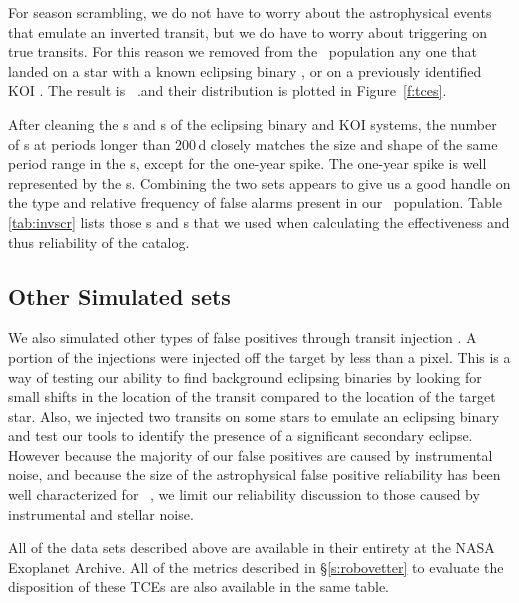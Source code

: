 For season scrambling, we do not have to worry about the astrophysical events that emulate an inverted transit, but we do have to worry about triggering on true transits. For this reason we removed from the \scrtce\ population any one that landed on a star with a known eclipsing binary \citep{Kirk2016}, or on a previously identified KOI \citep{Coughlin2016}.  The result is \nscrtces\ \scrtce.and their distribution is plotted in Figure~\ref{f:tces}. 

After cleaning the \invtce s and \scrtce s of the eclipsing binary and KOI systems, the number of \scrtce s at periods longer than 200\,d closely matches the size and shape of the same period range in the \opstce s, except for the one-year spike.  The one-year spike is well represented by the \invtce s.  Combining the two sets appears to give us a good handle on the type and relative frequency of false alarms present in our \opstce\ population. Table\,\ref{tab:invscr} lists those \invtce s and \sctce s that we used when calculating the effectiveness and thus reliability of the catalog.



\subsection{Other Simulated sets}
We also simulated other types of false positives through transit injection \citep{Christiansen2017}. A portion of the injections were injected off the target by less than a pixel.  This is a way of testing our ability to find background eclipsing binaries by looking for small shifts in the location of the transit compared to the location of the target star.  Also, we injected two transits on some stars to emulate an eclipsing binary and test our tools to identify the presence of a significant secondary eclipse.  However because the majority of our false positives are caused by instrumental noise, and because the size of the astrophysical false positive reliability has been well characterized for \Kepler\ \citep[e.g.][]{Morton2016}, we limit our reliability discussion to those caused by instrumental and stellar noise. 


All of the data sets described above are available in their entirety at the NASA Exoplanet Archive.  All of the metrics described in \S\ref{s:robovetter} to evaluate the disposition of these TCEs are also available in the same table. 